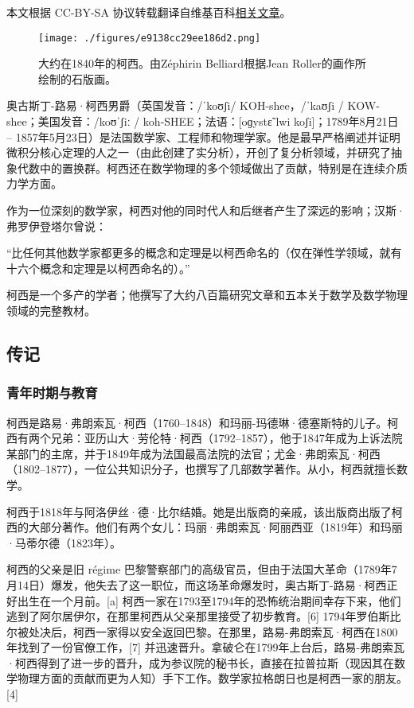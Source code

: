 
本文根据 CC-BY-SA 协议转载翻译自维基百科\href{https://en.wikipedia.org/wiki/Pierre-Simon_Laplace}{相关文章}。

\begin{figure}[ht]
\centering
\texttt{[image: ./figures/e9138cc29ee186d2.png]}
\caption{大约在1840年的柯西。由Zéphirin Belliard根据Jean Roller的画作所绘制的石版画。} \label{fig_August_1}
\end{figure}
奥古斯丁-路易·柯西男爵（英国发音：/ˈkoʊʃi/ KOH-shee，/ˈkaʊʃi / KOW-shee；美国发音：/koʊˈʃiː / koh-SHEE；法语：[oɡystɛ̃ lwi koʃi]；1789年8月21日 – 1857年5月23日）是法国数学家、工程师和物理学家。他是最早严格阐述并证明微积分核心定理的人之一（由此创建了实分析），开创了复分析领域，并研究了抽象代数中的置换群。柯西还在数学物理的多个领域做出了贡献，特别是在连续介质力学方面。

作为一位深刻的数学家，柯西对他的同时代人和后继者产生了深远的影响；汉斯·弗罗伊登塔尔曾说：

“比任何其他数学家都更多的概念和定理是以柯西命名的（仅在弹性学领域，就有十六个概念和定理是以柯西命名的）。”

柯西是一个多产的学者；他撰写了大约八百篇研究文章和五本关于数学及数学物理领域的完整教材。
\subsection{传记}  
\subsubsection{青年时期与教育}  
柯西是路易·弗朗索瓦·柯西（1760–1848）和玛丽-玛德琳·德塞斯特的儿子。柯西有两个兄弟：亚历山大·劳伦特·柯西（1792–1857），他于1847年成为上诉法院某部门的主席，并于1849年成为法国最高法院的法官；尤金·弗朗索瓦·柯西（1802–1877），一位公共知识分子，也撰写了几部数学著作。从小，柯西就擅长数学。

柯西于1818年与阿洛伊丝·德·比尔结婚。她是出版商的亲戚，该出版商出版了柯西的大部分著作。他们有两个女儿：玛丽·弗朗索瓦·阿丽西亚（1819年）和玛丽·马蒂尔德（1823年）。

柯西的父亲是旧 régime 巴黎警察部门的高级官员，但由于法国大革命（1789年7月14日）爆发，他失去了这一职位，而这场革命爆发时，奥古斯丁-路易·柯西正好出生在一个月前。[a] 柯西一家在1793至1794年的恐怖统治期间幸存下来，他们逃到了阿尔居伊尔，在那里柯西从父亲那里接受了初步教育。[6] 1794年罗伯斯比尔被处决后，柯西一家得以安全返回巴黎。在那里，路易-弗朗索瓦·柯西在1800年找到了一份官僚工作，[7] 并迅速晋升。拿破仑在1799年上台后，路易-弗朗索瓦·柯西得到了进一步的晋升，成为参议院的秘书长，直接在拉普拉斯（现因其在数学物理方面的贡献而更为人知）手下工作。数学家拉格朗日也是柯西一家的朋友。[4]

